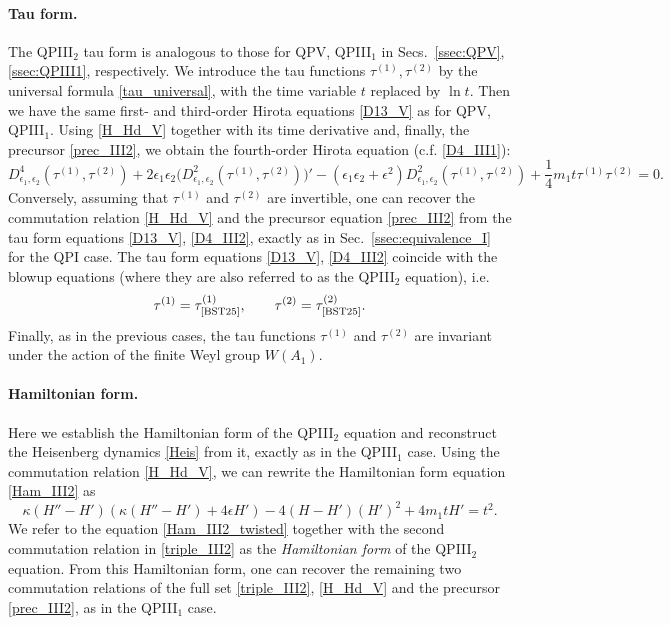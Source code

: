 \documentclass[12pt,a4paper]{article}
\numberwithin{equation}{section}
\begin{document}
\paragraph{Tau form.}
The QPIII$_2$ tau form is analogous to those for QPV, QPIII$_1$ in Secs.~\ref{ssec:QPV},\ref{ssec:QPIII1}, respectively. We introduce the tau functions $\tau^{(1)},\tau^{(2)}$ by the universal formula \eqref{tau_universal}, with the time variable $t$ replaced by $\ln t$. Then we have the same first- and third-order Hirota equations \eqref{D13_V} as for QPV, QPIII$_1$. Using  \eqref{H_Hd_V} together with its time derivative and, finally, the precursor \eqref{prec_III2}, we obtain the fourth-order Hirota equation (c.f. \eqref{D4_III1}):
\begin{equation}\label{D4_III2}
D^4_{\epsilon_1,\epsilon_2}\left(\tau^{(1)},\tau^{(2)}\right)+2\epsilon_1\epsilon_2\big(D^2_{\epsilon_1,\epsilon_2}\left(\tau^{(1)},\tau^{(2)}\right)\big)'-(\epsilon_1\epsilon_2{+}\epsilon^2)D^2_{\epsilon_1,\epsilon_2}\left(\tau^{(1)},\tau^{(2)}\right)+\frac14m_1t\tau^{(1)}\tau^{(2)}=0.   
\end{equation} 
Conversely, assuming that $\tau^{(1)}$ and $\tau^{(2)}$ are invertible, one can recover the commutation relation \eqref{H_Hd_V} and the precursor equation \eqref{prec_III2} from the tau form equations \eqref{D13_V}, \eqref{D4_III2}, exactly as in Sec.~\ref{ssec:equivalence_I} for the QPI case. 
The tau form equations \eqref{D13_V}, \eqref{D4_III2} coincide with the blowup equations \cite[(3.1),(3.5)]{BST25} (where they are also referred to as the QPIII$_2$ equation), i.e.
\begin{equation}\label{conn_III2}
\tau^{(1)}=\tau^{(1)}_{\textrm{\cite{BST25}}}, \qquad \tau^{(2)}=\tau^{(2)}_{\textrm{\cite{BST25}}}.    
\end{equation}
Finally, as in the previous cases, the tau functions $\tau^{(1)}$ and $\tau^{(2)}$ are invariant under the action of the finite Weyl group $W(A_1)$.

\paragraph{Hamiltonian form.}
Here we establish the Hamiltonian form of the QPIII$_2$ equation and reconstruct the Heisenberg dynamics \eqref{Heis} from it, exactly as in the QPIII$_1$ case. Using the commutation relation \eqref{H_Hd_V}, we can rewrite the Hamiltonian form equation \eqref{Ham_III2} as
\begin{equation}
\label{Ham_III2_twisted}
\kappa(H''-H')(\kappa(H''-H')+4\epsilon H')-4(H-H')(H')^2+4m_1tH'=t^2.
\end{equation}
We refer to the equation \eqref{Ham_III2_twisted} together with the second commutation relation in \eqref{triple_III2} as the \textit{Hamiltonian form} of the QPIII$_2$ equation.
From this Hamiltonian form, one can recover the remaining two commutation relations of the full set \eqref{triple_III2}, \eqref{H_Hd_V} and the precursor \eqref{prec_III2}, as in the QPIII$_1$ case.
\end{document}
